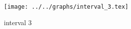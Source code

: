 \begin{figure}[h] \centering\texttt{[image: ../../graphs/interval\_3.tex]}\caption{interval 3}\label{gr:interval_3} \end{figure}
